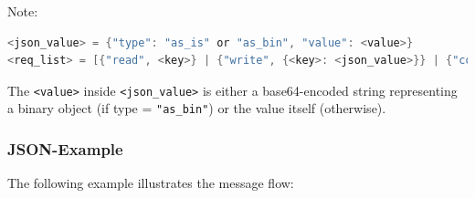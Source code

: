\documentclass[a4paper]{scrreprt}
\newcommand{\code}[1]{\lstinline[basicstyle=\ttfamily]!#1!}
\begin{document}
Note:
\begin{lstlisting}[language=java]
<json_value> = {"type": "as_is" or "as_bin", "value": <value>}
<req_list> = [{"read", <key>} | {"write", {<key>: <json_value>}} | {"commit", _}]
\end{lstlisting}
The \code{<value>} inside \code{<json_value>} is either a base64-encoded
string representing a binary object (if type = \code{"as_bin"}) or the value
itself (otherwise).

\subsubsection{JSON-Example}

The following example illustrates the message flow:

\end{document}
